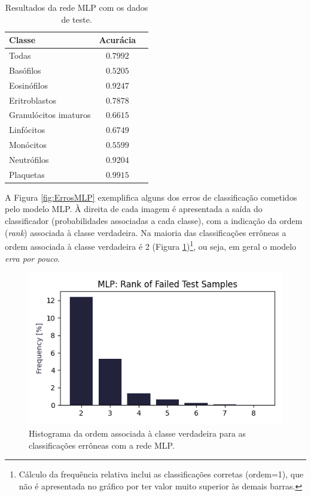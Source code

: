 \documentclass[final,5p]{elsarticle}
\numberwithin{equation}{section}
\begin{document}
    \begin{table}[h]
        \centering
        \begin{tabular}{l c c}
            \toprule
            \textbf{Classe} & \textbf{Acurácia} \\
            \midrule
            Todas & $0.7992$ \\
            \addlinespace
            Basófilos  & $0.5205$ \\
            Eosinófilos  & $0.9247$ \\
            Eritroblastos  & $0.7878$ \\
            Granulócitos imaturos  & $0.6615$ \\
            Linfócitos  & $0.6749$ \\
            Monócitos  & $0.5599$ \\
            Neutrófilos  & $0.9204$ \\
            Plaquetas  & $0.9915$ \\
            \bottomrule
        \end{tabular}
        \caption{Resultados da rede MLP com os dados de teste.}\label{tab:ResultadosMLP}
    \end{table}

    A Figura \ref{fig:ErrosMLP} exemplifica alguns dos erros de classificação cometidos pelo modelo MLP. À direita de cada imagem é apresentada a saída do classificador (probabilidades associadas a cada classe), com a indicação da ordem (\emph{rank}) associada à classe verdadeira. Na maioria das classificações errôneas a ordem associada à classe verdadeira é 2 (Figura \ref{fig:HistogramaErrosMLP})\footnote{Cálculo da frequência relativa inclui as classificações corretas (ordem=1), que não é apresentada no gráfico por ter valor muito superior às demais barras.}, ou seja, em geral o modelo \emph{erra por pouco}.

    \begin{figure}[hbt!]
        \includegraphics[width=0.95\columnwidth]{MLP_rank.png}
        \caption{Histograma da ordem associada à classe verdadeira para as classificações errôneas com a rede MLP.}\label{fig:HistogramaErrosMLP}
    \end{figure}
\end{document}
